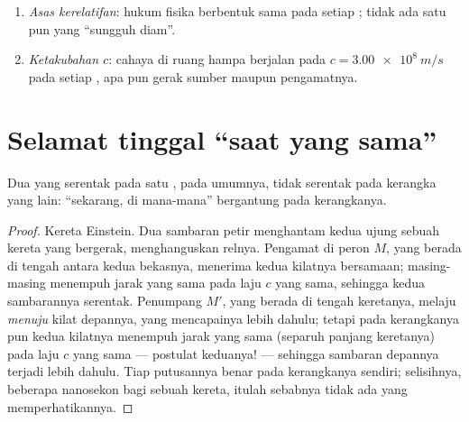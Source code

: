 \begin{theorem}\label{thm:g12:special-relativity:postulates}
\begin{enumerate}
  \item \emph{Asas kerelatifan}: hukum fisika berbentuk sama
        pada setiap ; tidak ada satu pun yang ``sungguh diam''.
  \item \emph{Ketakubahan $c$}: cahaya di ruang hampa berjalan pada
        $c = \qty{3.00e8}{m/s}$ pada setiap , apa pun
        gerak sumber maupun pengamatnya.
\end{enumerate}
\end{theorem}
\admitted

\section{Selamat tinggal ``saat yang sama''}

\begin{proposition}\label{prop:g12:special-relativity:simultaneity}
Dua  yang serentak pada satu , pada umumnya, tidak
serentak pada kerangka yang lain: ``sekarang, di mana-mana'' bergantung pada kerangkanya.
\end{proposition}

\begin{proof}
Kereta Einstein. Dua sambaran petir menghantam kedua ujung sebuah kereta yang bergerak,
menghanguskan relnya. Pengamat di peron $M$, yang berada di tengah antara kedua
bekasnya, menerima kedua kilatnya bersamaan; masing-masing menempuh jarak yang sama pada
laju $c$ yang sama, sehingga kedua sambarannya serentak. Penumpang $M'$,
yang berada di tengah keretanya, melaju \emph{menuju} kilat depannya, yang mencapainya
lebih dahulu; tetapi pada kerangkanya pun kedua kilatnya menempuh jarak yang sama (separuh
panjang keretanya) pada laju $c$ yang sama --- postulat keduanya! --- sehingga sambaran
depannya terjadi lebih dahulu. Tiap putusannya benar pada kerangkanya sendiri;
selisihnya, beberapa nanosekon bagi sebuah kereta, itulah sebabnya tidak ada yang memperhatikannya.
\end{proof}


